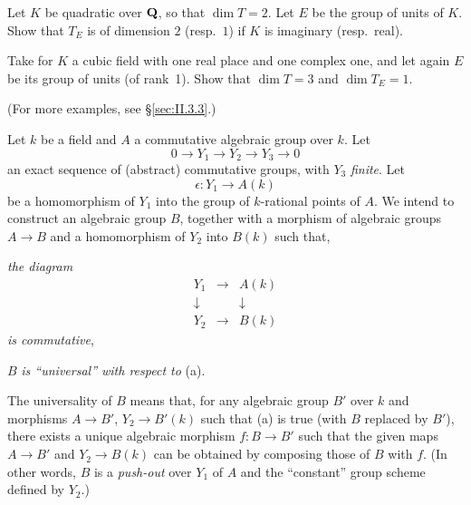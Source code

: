 \begin{alist}
\item[\emph{a.}] Let $K$ be quadratic over $\mathbf{Q}$, so that $\dim T = 2$.
Let $E$ be the group of units of $K$.  Show that $T_E$ is of dimension
$2$ (resp.~$1$) if $K$ is imaginary (resp.~real).
\item[\emph{b.}] Take for $K$ a cubic field with one real place and one
complex one, and let again $E$ be its group of units (of rank~1).  Show
that $\dim T = 3$ and $\dim T_E = 1$.
\end{alist}

(For more examples, see \S\ref{sec:II.3.3}.)


Let $k$ be a field and $A$ a commutative algebraic group over $k$.  Let
\begin{equation}
\tag{$*$}\label{eq:II.1.3.star}
0 \longrightarrow Y_1 \longrightarrow Y_2 \longrightarrow Y_3
\longrightarrow 0
\end{equation}
an exact sequence of (abstract) commutative groups, with $Y_3$
\emph{finite}.  Let
\[
\epsilon : Y_1 \longrightarrow A(k)
\]
be a homomorphism of $Y_1$ into the group of $k$-rational points of $A$.
We intend to construct an algebraic group $B$, together with a morphism of
algebraic groups $A \to B$ and a homomorphism of $Y_2$ into $B(k)$ such
that,
\begin{alist}
\item \emph{the diagram}
\[
\begin{array}{ccc}
Y_1 & \longrightarrow & A(k) \\
\downarrow & & \downarrow \\
Y_2 & \longrightarrow & B(k)
\end{array}
\]
\emph{is commutative},
\item $B$ \emph{is ``universal'' with respect to} (a).
\end{alist}

The universality of $B$ means that, for any algebraic group $B'$ over $k$
and morphisms $A \to B'$, $Y_2 \to B'(k)$ such that (a) is true (with $B$
replaced by $B'$), there exists a unique algebraic morphism
$f\colon B \to B'$ such that the given maps $A \to B'$ and
$Y_2 \to B(k)$ can be obtained by composing those of $B$ with $f$.
(In other words, $B$ is a \emph{push-out} over $Y_1$ of $A$ and the
``constant'' group scheme defined by $Y_2$.)

